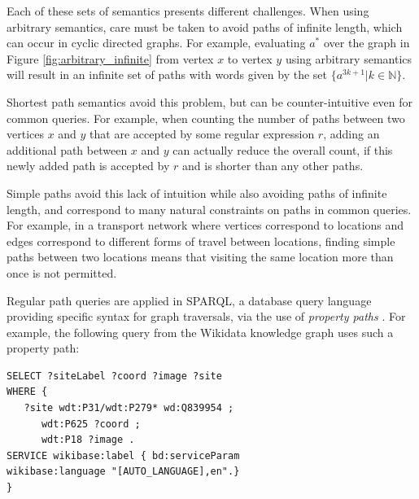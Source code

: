 \documentclass{article}
\begin{document}
Each of these sets of semantics presents different challenges. When using arbitrary semantics, care must be taken to avoid paths of infinite length, which can occur in cyclic directed graphs. For example, evaluating $a^*$ over the graph in Figure \ref{fig:arbitrary_infinite} from vertex $x$ to vertex $y$ using arbitrary semantics will result in an infinite set of paths with words given by the set $\{a^{3k+1} | k \in \mathbb{N}\}$.

Shortest path semantics avoid this problem, but can be counter-intuitive even for common queries. For example, when counting the number of paths between two vertices $x$ and $y$ that are accepted by some regular expression $r$, adding an additional path between $x$ and $y$ can actually reduce the overall count, if this newly added path is accepted by $r$ and is shorter than any other paths.

Simple paths avoid this lack of intuition while also avoiding paths of infinite length, and correspond to many natural constraints on paths in common queries. For example, in a transport network where vertices correspond to locations and edges correspond to different forms of travel between locations, finding simple paths between two locations means that visiting the same location more than once is not permitted.

Regular path queries are applied in SPARQL, a database query language providing specific syntax for graph traversals, via the use of \emph{property paths} \cite{SPARQLQueryLanguage}. For example, the following query from the Wikidata knowledge graph \cite{WikidataSPARQLQuery} uses such a property path:


\begin{lstlisting}[language=SPARQL]
SELECT ?siteLabel ?coord ?image ?site
WHERE {
   ?site wdt:P31/wdt:P279* wd:Q839954 ;
      wdt:P625 ?coord ;
      wdt:P18 ?image .
SERVICE wikibase:label { bd:serviceParam
wikibase:language "[AUTO_LANGUAGE],en".}
}
\end{lstlisting}
\end{document}
